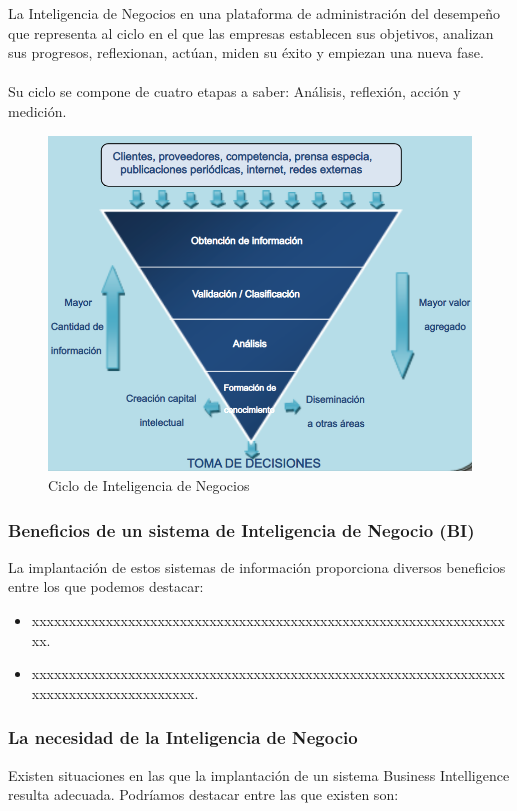 \documentclass[preprint,12pt]{elsarticle}
\begin{document}
La Inteligencia de Negocios en una plataforma de administración del desempeño que representa al ciclo en el que las empresas establecen sus objetivos, analizan sus progresos, reflexionan, actúan, miden su éxito y empiezan una nueva fase. \\ \\Su ciclo se compone de cuatro etapas a saber: Análisis, reflexión, acción y medición. \cite{referenciaestrella1}

\begin{figure}[htb]
	\begin{center}
		\includegraphics[width=12cm]{./IMAGENES/ciclo_BI} 
		\caption{Ciclo de Inteligencia de Negocios}
	\end{center}
\end{figure}

	\subsubsection{\textbf{Beneficios de un sistema de Inteligencia de Negocio (BI)}}
	La implantación de estos sistemas de información proporciona diversos beneficios entre los que podemos destacar:

	\begin{itemize}
	\item xxxxxxxxxxxxxxxxxxxxxxxxxxxxxxxxxxxxxxxxxxxxxxxxxxxxxxxxxxxxxxxxxx.
	\item xxxxxxxxxxxxxxxxxxxxxxxxxxxxxxxxxxxxxxxxxxxxxxxxxxxxxxxxxxxxxxxxxxxxxxxxxxxxxxxxxxxxxx.
	\end{itemize}\cite{referenciarobles3}
	\subsubsection{\textbf{La necesidad de la Inteligencia de Negocio}}
	Existen situaciones en las que la implantación de un sistema Business Intelligence  resulta adecuada. Podríamos destacar 
	entre las que existen son:
\end{document}
